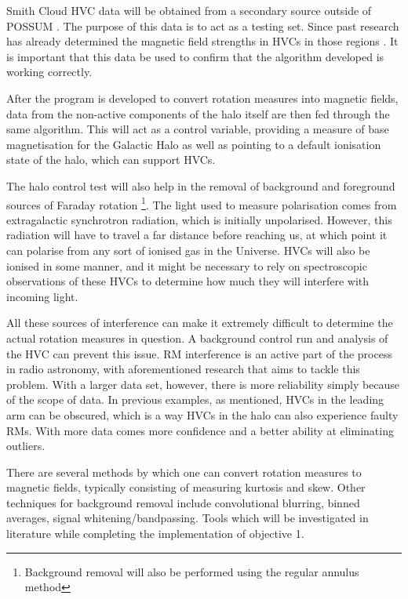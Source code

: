 Smith Cloud HVC data will be obtained from a secondary source outside of POSSUM \cite{ID18, ID26, ID28}. The purpose of this data is to act as a testing set. Since past research has already determined the magnetic field strengths in HVCs in those regions \cite{ID26}. It is important that this data be used to confirm that the algorithm developed is working correctly.

After the program is developed to convert rotation measures into magnetic fields, data from the non-active components of the halo itself are then fed through the same algorithm. This will act as a control variable, providing a measure of base magnetisation for the Galactic Halo as well as pointing to a default ionisation state of the halo, which can support HVCs.

The halo control test will also help in the removal of background and foreground sources of Faraday rotation \footnote{Background removal will also be performed using the regular annulus method}. The light used to measure polarisation comes from extragalactic synchrotron radiation, which is initially unpolarised. However, this radiation will have to travel a far distance before reaching us, at which point it can polarise from any sort of ionised gas in the Universe. HVCs will also be ionised in some manner, and it might be necessary to rely on spectroscopic observations of these HVCs to determine how much they will interfere with incoming light.

All these sources of interference can make it extremely difficult to determine the actual rotation measures in question. A background control run and analysis of the HVC can prevent this issue. RM interference is an active part of the process in radio astronomy, with aforementioned research that aims to tackle this problem. With a larger data set, however, there is more reliability simply because of the scope of data. In previous examples, as mentioned, HVCs in the leading arm can be obscured, which is a way HVCs in the halo can also experience faulty RMs. With more data comes more confidence and a better ability at eliminating outliers.

There are several methods by which one can convert rotation measures to magnetic fields, typically consisting of measuring kurtosis and skew. Other techniques for background removal include convolutional blurring, binned averages, signal whitening/bandpassing. Tools which will be investigated in literature while completing the implementation of objective 1.

